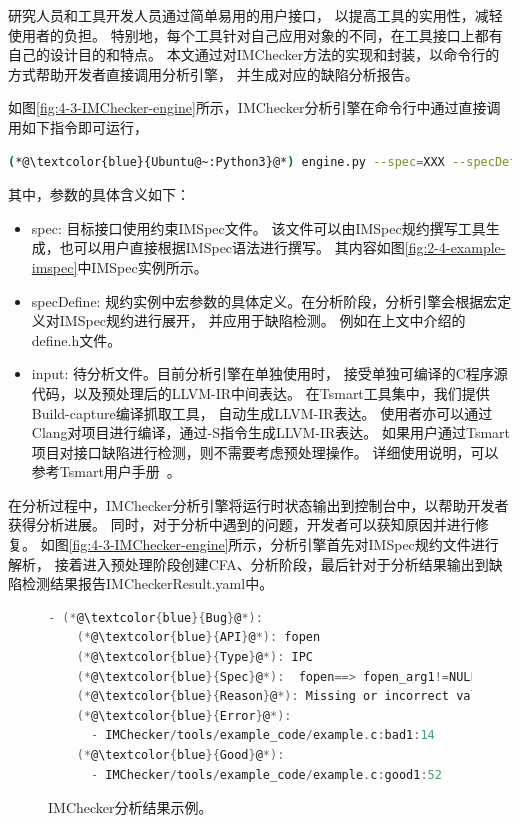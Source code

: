 研究人员和工具开发人员通过简单易用的用户接口，
以提高工具的实用性，减轻使用者的负担。
特别地，每个工具针对自己应用对象的不同，在工具接口上都有自己的设计目的和特点。
本文通过对IMChecker方法的实现和封装，以命令行的方式帮助开发者直接调用分析引擎，
并生成对应的缺陷分析报告。

如图\ref{fig:4-3-IMChecker-engine}所示，IMChecker分析引擎在命令行中通过直接调用如下指令即可运行，
\begin{lstlisting}[language={bash},
basicstyle=\linespread{0.8}\listingsfont,
numbers=none,
xleftmargin=.1\textwidth]
(*@\textcolor{blue}{Ubuntu@~:Python3}@*) engine.py --spec=XXX --specDefine=XXX --input=XXX
\end{lstlisting}
其中，参数的具体含义如下：
\begin{itemize}
	\item spec: 目标接口使用约束IMSpec文件。
	该文件可以由IMSpec规约撰写工具生成，也可以用户直接根据IMSpec语法进行撰写。
	其内容如图\ref{fig:2-4-example-imspec}中IMSpec实例所示。
	\item specDefine: 规约实例中宏参数的具体定义。在分析阶段，分析引擎会根据宏定义对IMSpec规约进行展开，
	并应用于缺陷检测。
	例如在上文中介绍的define.h文件。
	\item input: 待分析文件。目前分析引擎在单独使用时，
	接受单独可编译的C程序源代码，以及预处理后的LLVM-IR中间表达。
	在Tsmart工具集中，我们提供Build-capture编译抓取工具，
	自动生成LLVM-IR表达。
	使用者亦可以通过Clang对项目进行编译，通过-S指令生成LLVM-IR表达。
	如果用户通过Tsmart项目对接口缺陷进行检测，则不需要考虑预处理操作。
	详细使用说明，可以参考Tsmart用户手册~\cite{tsmart}。
\end{itemize}

在分析过程中，IMChecker分析引擎将运行时状态输出到控制台中，以帮助开发者获得分析进展。
同时，对于分析中遇到的问题，开发者可以获知原因并进行修复。
如图\ref{fig:4-3-IMChecker-engine}所示，分析引擎首先对IMSpec规约文件进行解析，
接着进入预处理阶段创建CFA、分析阶段，最后针对于分析结果输出到缺陷检测结果报告IMCheckerResult.yaml中。

\begin{figure}[b]
	\centering
	\begin{minipage}{0.7\linewidth}
\begin{lstlisting}[language={C},
basicstyle=\linespread{0.7}\listingsfont,
numbers=none,frame=trBL,
xleftmargin=0pt]
  - (*@\textcolor{blue}{Bug}@*):
    (*@\textcolor{blue}{API}@*): fopen
    (*@\textcolor{blue}{Type}@*): IPC
    (*@\textcolor{blue}{Spec}@*):  fopen==> fopen_arg1!=NULL
    (*@\textcolor{blue}{Reason}@*): Missing or incorrect validation of parameter
    (*@\textcolor{blue}{Error}@*): 
      - IMChecker/tools/example_code/example.c:bad1:14
    (*@\textcolor{blue}{Good}@*): 
      - IMChecker/tools/example_code/example.c:good1:52
\end{lstlisting}
	\end{minipage}
	\caption{
		IMChecker分析结果示例。
	}
	\label{fig:4-3-Result}
\end{figure}

